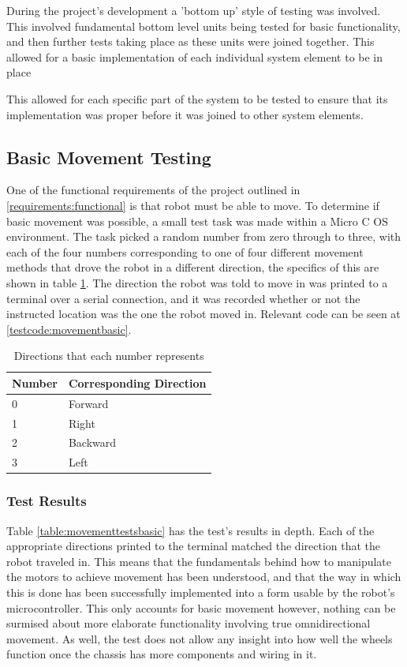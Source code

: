 		During the project's development a 'bottom up' style of testing was involved. This involved fundamental bottom level units being tested for basic functionality, and then further tests taking place as these units were joined together. This allowed for a basic implementation of each individual system element to be in place 
		
		This allowed for each specific part of the system to be tested to ensure that its implementation was proper before it was joined to other system elements.
	
			\subsection{Basic Movement Testing}
			One of the functional requirements of the project outlined in \ref{requirements:functional} is that robot must be able to move. To determine if basic movement was possible, a small test task was made within a Micro C OS environment. The task picked a random number from zero through to three, with each of the four numbers corresponding to one of four different movement methods that drove the robot in a different direction, the specifics of this are shown in table \ref{table:movementtestkey}. The direction the robot was told to move in was printed to a terminal over a serial connection, and it was recorded whether or not the instructed location was the one the robot moved in. Relevant code can be seen at \ref{testcode:movementbasic}.
			
			\begin{table}[h!]
				\centering
				\begin{tabular}{| l | l |} 
					\hline
					Number & Corresponding Direction \\ [0.5ex] 
					\hline
					0 & Forward \\ 
					1 & Right \\
					2 & Backward \\
					3 & Left \\ [1ex] 
					\hline
				\end{tabular}
				\caption{Directions that each number represents}
				\label{table:movementtestkey}		
			\end{table}
			
				\subsubsection{Test Results}
				Table \ref{table:movementtestsbasic} has the test's results in depth. Each of the appropriate directions printed to the terminal matched the direction that the robot traveled in. This means that the fundamentals behind how to manipulate the motors to achieve movement has been understood, and that the way in which this is done has been successfully implemented into a form usable by the robot's microcontroller. This only accounts for basic movement however, nothing can be surmised about more elaborate functionality involving true omnidirectional movement. As well, the test does not allow any insight into how well the wheels function once the chassis has more components and wiring in it.
			
